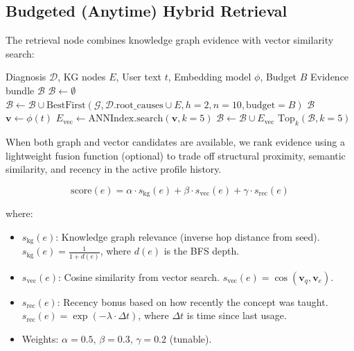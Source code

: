\documentclass[11pt,a4paper,twocolumn]{article}
\begin{document}
\subsection{Budgeted (Anytime) Hybrid Retrieval}

The retrieval node combines knowledge graph evidence with vector similarity search:

\begin{algorithm}[h]
\caption{Budgeted Hybrid Retrieval (Anytime)}
\label{alg:hybrid}
\footnotesize
\begin{algorithmic}[1]
\REQUIRE Diagnosis $\mathcal{D}$, KG nodes $E$, User text $t$, Embedding model $\phi$, Budget $B$
\ENSURE Evidence bundle $\mathcal{B}$
\STATE {}
\STATE $\mathcal{B} \leftarrow \emptyset$
\STATE $\mathcal{B} \leftarrow \mathcal{B} \cup \text{BestFirst}(\mathcal{G}, \mathcal{D}.\text{root\_causes} \cup E, h{=}2, n{=}10, \text{budget}=B)$
  \RETURN $\mathcal{B}$
\ENDIF
\STATE {}
\STATE $\mathbf{v} \leftarrow \phi(t)$
\STATE $E_\text{vec} \leftarrow \text{ANNIndex}.\text{search}(\mathbf{v}, k{=}5)$ 
\STATE $\mathcal{B} \leftarrow \mathcal{B} \cup E_\text{vec}$
\RETURN $\text{Top}_k(\mathcal{B}, k{=}5)$
\end{algorithmic}
\end{algorithm}

When both graph and vector candidates are available, we rank evidence using a lightweight fusion function (optional) to trade off structural proximity, semantic similarity, and recency in the active profile history.

\begin{equation}
\label{eq:fusion}
\text{score}(e) = \alpha \cdot s_\text{kg}(e) + \beta \cdot s_\text{vec}(e) + \gamma \cdot s_\text{rec}(e)
\end{equation}

\noindent where:
\begin{itemize}[leftmargin=*]
  \item $s_\text{kg}(e)$: Knowledge graph relevance (inverse hop distance from seed). $s_\text{kg}(e) = \frac{1}{1 + d(e)}$, where $d(e)$ is the BFS depth.
  \item $s_\text{vec}(e)$: Cosine similarity from vector search. $s_\text{vec}(e) = \cos(\mathbf{v}_q, \mathbf{v}_e)$.
  \item $s_\text{rec}(e)$: Recency bonus based on how recently the concept was taught. $s_\text{rec}(e) = \exp(-\lambda \cdot \Delta t)$, where $\Delta t$ is time since last usage.
  \item Weights: $\alpha = 0.5$, $\beta = 0.3$, $\gamma = 0.2$ (tunable).
\end{itemize}
\end{document}
